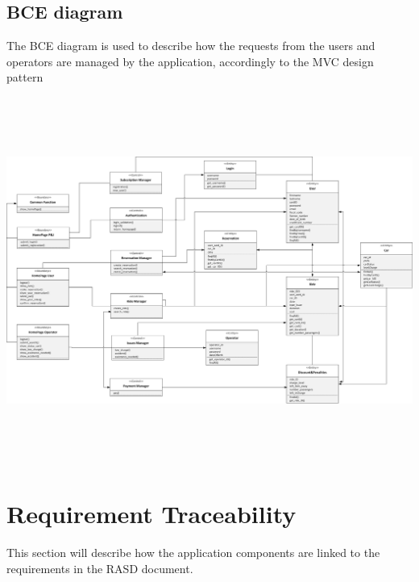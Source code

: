 \documentclass{article}
\begin{document}
\begin{flushleft}
\subsection{BCE diagram}
The BCE diagram is used to describe how the requests from the users and operators are managed by the application, accordingly to the MVC design pattern

\vspace{1cm}
\includegraphics[width=15cm, height=12cm]{BCE} 
\vspace{1cm}
\newpage


\section{Requirement Traceability} %
This section will describe how the application components are linked to the requirements in the RASD document.
\begin{description}



\end{description}
\end{flushleft}
\end{document}
